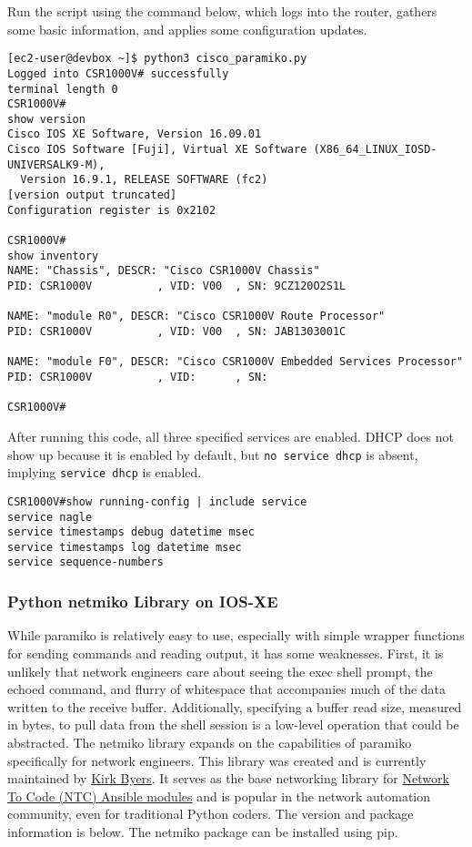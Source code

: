 Run the script using the command below, which logs into the router, gathers
some basic information, and applies some configuration updates.

\begin{verbatim}
[ec2-user@devbox ~]$ python3 cisco_paramiko.py
Logged into CSR1000V# successfully
terminal length 0
CSR1000V#
show version
Cisco IOS XE Software, Version 16.09.01
Cisco IOS Software [Fuji], Virtual XE Software (X86_64_LINUX_IOSD-UNIVERSALK9-M),
  Version 16.9.1, RELEASE SOFTWARE (fc2)
[version output truncated]
Configuration register is 0x2102

CSR1000V#
show inventory
NAME: "Chassis", DESCR: "Cisco CSR1000V Chassis"
PID: CSR1000V          , VID: V00  , SN: 9CZ120O2S1L

NAME: "module R0", DESCR: "Cisco CSR1000V Route Processor"
PID: CSR1000V          , VID: V00  , SN: JAB1303001C

NAME: "module F0", DESCR: "Cisco CSR1000V Embedded Services Processor"
PID: CSR1000V          , VID:      , SN:

CSR1000V#
\end{verbatim}

After running this code, all three specified services are enabled. DHCP does
not show up because it is enabled by default, but \verb|no service dhcp| is
absent, implying \verb|service dhcp| is enabled.
 
\begin{verbatim}
CSR1000V#show running-config | include service
service nagle
service timestamps debug datetime msec
service timestamps log datetime msec
service sequence-numbers
\end{verbatim}

\subsubsection{Python netmiko Library on IOS-XE}
While paramiko is relatively easy to use, especially with simple wrapper
functions for sending commands and reading output, it has some weaknesses.
First, it is unlikely that network engineers care about seeing the exec shell
prompt, the echoed command, and flurry of whitespace that accompanies much of
the data written to the receive buffer. Additionally, specifying a buffer read
size, measured in bytes, to pull data from the shell session is a low-level
operation that could be abstracted. The netmiko library expands on the
capabilities of paramiko specifically for network engineers. This library was
created and is currently maintained by
\href{https://pynet.twb-tech.com/blog/automation/netmiko.html}{Kirk Byers}.
It serves as the base networking library for
\href{https://github.com/networktocode/ntc-ansible}{Network To Code (NTC) Ansible modules}
and is popular in the network automation community, even for traditional Python
coders. The version and package information is below. The netmiko package can
be installed using pip.

